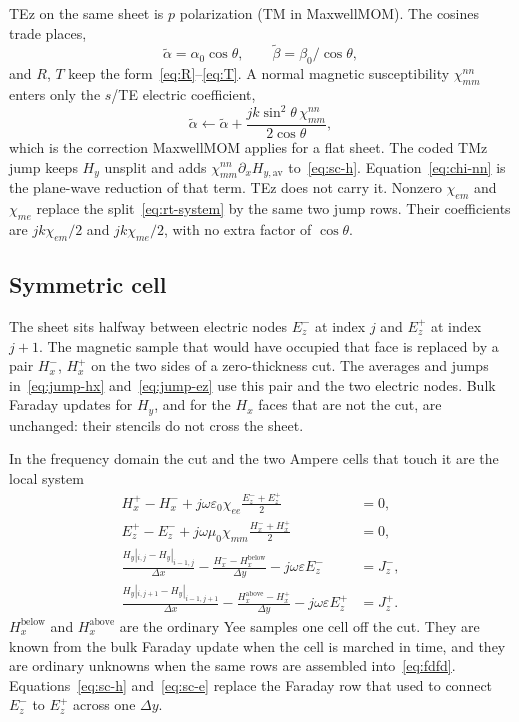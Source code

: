 \documentclass[11pt,a4paper]{article}
\numberwithin{equation}{section}
\begin{document}
TEz on the same sheet is $p$ polarization (TM in MaxwellMOM). The cosines
trade places,
\begin{equation}
\tilde\alpha = \alpha_0\cos\theta,
\qquad
\tilde\beta = \beta_0/\cos\theta,
\label{eq:tm-angle}
\end{equation}
and $R$, $T$ keep the form~\eqref{eq:R}--\eqref{eq:T}. A normal magnetic
susceptibility $\chi_{mm}^{nn}$ enters only the $s$/TE electric coefficient,
\begin{equation}
\tilde\alpha \leftarrow \tilde\alpha + \frac{jk\sin^2\theta\,\chi_{mm}^{nn}}{2\cos\theta},
\label{eq:chi-nn}
\end{equation}
which is the correction MaxwellMOM applies for a flat sheet. The coded TMz
jump keeps $H_y$ unsplit and adds $\chi_{mm}^{nn}\partial_x H_{y,\mathrm{av}}$
to~\eqref{eq:sc-h}. Equation~\eqref{eq:chi-nn} is the plane-wave reduction of
that term. TEz does not carry it. Nonzero $\chi_{em}$ and $\chi_{me}$
replace the split~\eqref{eq:rt-system} by the same two jump rows. Their
coefficients are $jk\chi_{em}/2$ and $jk\chi_{me}/2$, with no extra factor
of $\cos\theta$.

\subsection{Symmetric cell}
\label{sec:symmetric-cell}

The sheet sits halfway between electric nodes $E_z^-$ at index $j$ and
$E_z^+$ at index $j+1$. The magnetic sample that would have occupied that face
is replaced by a pair $H_x^-$, $H_x^+$ on the two sides of a zero-thickness
cut. The averages and jumps in~\eqref{eq:jump-hx} and~\eqref{eq:jump-ez} use
this pair and the two electric nodes. Bulk Faraday updates for $H_y$, and for
the $H_x$ faces that are not the cut, are unchanged: their stencils do not
cross the sheet.

In the frequency domain the cut and the two Ampere cells that touch it are
the local system
\begin{align}
H_x^+ - H_x^- + j\omega\varepsilon_0\chi_{ee}\frac{E_z^-+E_z^+}{2} &= 0,
\label{eq:sc-h}\\
E_z^+ - E_z^- + j\omega\mu_0\chi_{mm}\frac{H_x^-+H_x^+}{2} &= 0,
\label{eq:sc-e}\\
\frac{H_y|_{i,j}-H_y|_{i-1,j}}{\Delta x}
- \frac{H_x^- - H_x^{\mathrm{below}}}{\Delta y}
- j\omega\varepsilon E_z^- &= J_z^-,
\label{eq:sc-amp-m}\\
\frac{H_y|_{i,j+1}-H_y|_{i-1,j+1}}{\Delta x}
- \frac{H_x^{\mathrm{above}} - H_x^+}{\Delta y}
- j\omega\varepsilon E_z^+ &= J_z^+.
\label{eq:sc-amp-p}
\end{align}
$H_x^{\mathrm{below}}$ and $H_x^{\mathrm{above}}$ are the ordinary Yee samples
one cell off the cut. They are known from the bulk Faraday update when the
cell is marched in time, and they are ordinary unknowns when the same rows are
assembled into~\eqref{eq:fdfd}. Equations~\eqref{eq:sc-h} and~\eqref{eq:sc-e}
replace the Faraday row that used to connect $E_z^-$ to $E_z^+$ across one
$\Delta y$.
\end{document}
